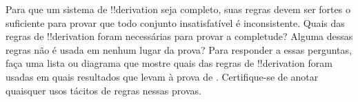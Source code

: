\documentclass[../../../include/open-logic-section]{subfiles}
\begin{document}
\begin{prob}
Para que um sistema de !!{derivation} seja completo, suas regras devem ser
fortes o suficiente para provar que todo conjunto insatisfatível é inconsistente.  Quais das
regras de !!{derivation} foram necessárias para provar a completude?  Alguma
dessas regras não é usada em nenhum lugar da prova?  Para responder
a essas perguntas, faça uma lista ou diagrama que mostre quais das regras
de !!{derivation} foram usadas em quais resultados que levam à prova de
.  Certifique-se de anotar quaisquer
usos tácitos de regras nessas provas.
\end{prob}
\tagendprob
\end{document}
